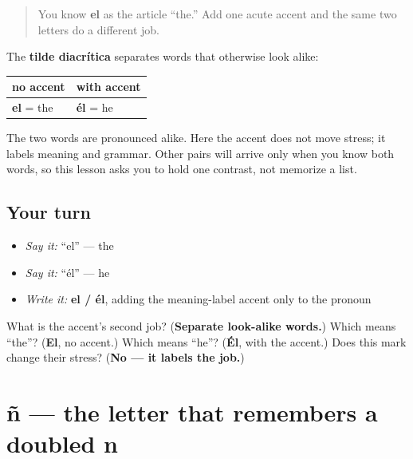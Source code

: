 \label{lesson:ES-W01-tilde-diacritica}



\begin{quote}
You know \textbf{el} as the article “the.” Add one acute accent and the same two letters do a different job.
\end{quote}

\begin{grammarlens}[title={Grammar Lens: one mark, two grammatical jobs}]
The \textbf{tilde diacrítica} separates words that otherwise look alike:

\noindent
\begin{tabularx}{\linewidth}{@{}>{\raggedright\arraybackslash}X>{\raggedright\arraybackslash}X@{}}
\toprule
\textbf{no accent} & \textbf{with accent} \\
\midrule
\textbf{el} = the & \textbf{él} = he \\
\bottomrule
\end{tabularx}

The two words are pronounced alike. Here the accent does not move stress; it labels meaning and grammar. Other pairs will arrive only when you know both words, so this lesson asks you to hold one contrast, not memorize a list.
\end{grammarlens}

\subsection*{Your turn}
\begin{itemize}
\raggedright
  \item \emph{Say it:} “el” — the
  \item \emph{Say it:} “él” — he
  \item \emph{Write it:} \textbf{el / él}, adding the meaning-label accent only to the pronoun
\end{itemize}

\begin{tcolorbox}[breakable,colback=teal!4,colframe=teal!35!black,title={Before you move on}]
What is the accent's second job? (\textbf{Separate look-alike words.}) Which means “the”? (\textbf{El}, no accent.) Which means “he”? (\textbf{Él}, with the accent.) Does this mark change their stress? (\textbf{No — it labels the job.})
\end{tcolorbox}
\section[ñ]{ñ — the letter that remembers a doubled n}

